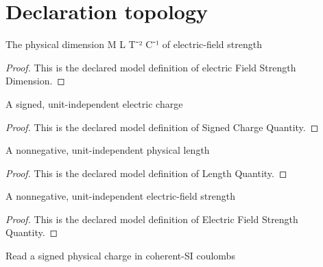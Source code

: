 \section{Declaration topology}
\begin{definition}
  \label{def:physics:phyx-mini-0914:phyxminiproblems-problemphyxmini0914-electricfieldstrengthdimension}
  The physical dimension M L T⁻² C⁻¹ of electric-field strength
\end{definition}
\begin{proof}
  This is the declared model definition of electric Field Strength Dimension.
\end{proof}
\begin{definition}
  \label{def:physics:phyx-mini-0914:phyxminiproblems-problemphyxmini0914-signedchargequantity}
  A signed, unit-independent electric charge
\end{definition}
\begin{proof}
  This is the declared model definition of Signed Charge Quantity.
\end{proof}
\begin{definition}
  \label{def:physics:phyx-mini-0914:phyxminiproblems-problemphyxmini0914-lengthquantity}
  A nonnegative, unit-independent physical length
\end{definition}
\begin{proof}
  This is the declared model definition of Length Quantity.
\end{proof}
\begin{definition}
  \label{def:physics:phyx-mini-0914:phyxminiproblems-problemphyxmini0914-electricfieldstrengthquantity}
  A nonnegative, unit-independent electric-field strength
\end{definition}
\begin{proof}
  This is the declared model definition of Electric Field Strength Quantity.
\end{proof}
\begin{definition}
  \label{def:physics:phyx-mini-0914:phyxminiproblems-problemphyxmini0914-chargeincoulombs}
  Read a signed physical charge in coherent-SI coulombs
\end{definition}
